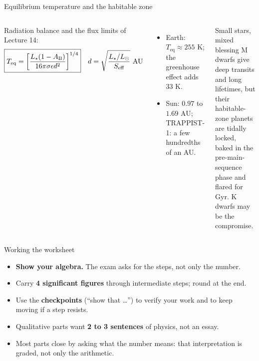 \documentclass[aspectratio=169, 11pt]{beamer}
\begin{document}
\begin{frame}{Equilibrium temperature and the habitable zone}
  \small
  \begin{columns}[T]
    Radiation balance and the flux limits of Lecture 14:
    \[
      \boxed{T_\mathrm{eq} = \left[\frac{L_\star(1-A_\mathrm{B})}{16\pi\sigma\epsilon d^2}\right]^{1/4}} \quad d = \sqrt{\frac{L_\star/\Lsun}{S_\mathrm{eff}}}\ \mathrm{AU}
    \]
    \begin{itemize}
      \item Earth: $T_\mathrm{eq} \approx 255$ K; the greenhouse effect adds $33$ K.
      \item Sun: $0.97$ to $1.69$ AU; TRAPPIST-1: a few hundredths of an AU.
    \end{itemize}

    \begin{block}{Small stars, mixed blessing}
      M dwarfs give deep transits and long lifetimes, but their habitable-zone planets are tidally locked, baked in the pre-main-sequence phase and flared for Gyr. K dwarfs may be the compromise.
    \end{block}
  \end{columns}
\end{frame}

\begin{frame}{Working the worksheet}
  \begin{itemize}
    \item \textbf{Show your algebra.} The exam asks for the steps, not only the number.
    \item Carry \textbf{4 significant figures} through intermediate steps; round at the end.
    \item Use the \textbf{checkpoints} (``show that \ldots'') to verify your work and to keep moving if a step resists.
    \item Qualitative parts want \textbf{2 to 3 sentences} of physics, not an essay.
    \item Most parts close by asking what the number means: that interpretation is graded, not only the arithmetic.
  \end{itemize}
  \vskip8pt\relax
\end{frame}
\end{document}
